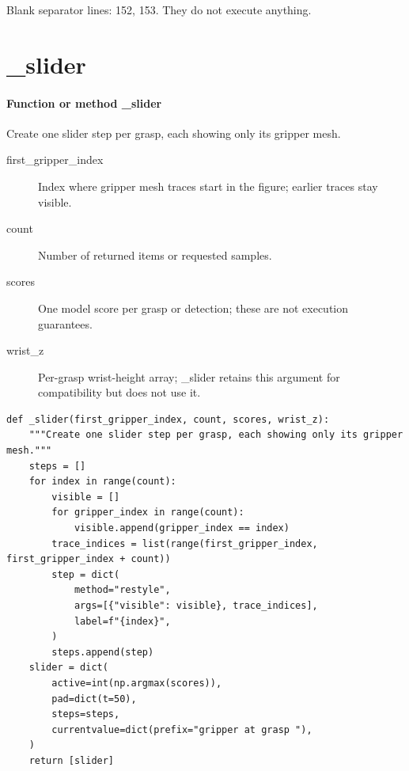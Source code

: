 \documentclass[11pt,a4paper]{book}
\begin{document}
Blank separator lines: 152, 153. They do not execute anything.

\section{\_slider}

\paragraph{Function or method \_slider}
Create one slider step per grasp, each showing only its gripper mesh.

\begin{description}
\item[first\_gripper\_index] Index where gripper mesh traces start in the figure; earlier traces stay visible.
\item[count] Number of returned items or requested samples.
\item[scores] One model score per grasp or detection; these are not execution guarantees.
\item[wrist\_z] Per-grasp wrist-height array; \_slider retains this argument for compatibility but does not use it.
\end{description}

\begin{lstlisting}[firstnumber=154]
def _slider(first_gripper_index, count, scores, wrist_z):
    """Create one slider step per grasp, each showing only its gripper mesh."""
    steps = []
    for index in range(count):
        visible = []
        for gripper_index in range(count):
            visible.append(gripper_index == index)
        trace_indices = list(range(first_gripper_index, first_gripper_index + count))
        step = dict(
            method="restyle",
            args=[{"visible": visible}, trace_indices],
            label=f"{index}",
        )
        steps.append(step)
    slider = dict(
        active=int(np.argmax(scores)),
        pad=dict(t=50),
        steps=steps,
        currentvalue=dict(prefix="gripper at grasp "),
    )
    return [slider]


\end{lstlisting}
\end{document}

